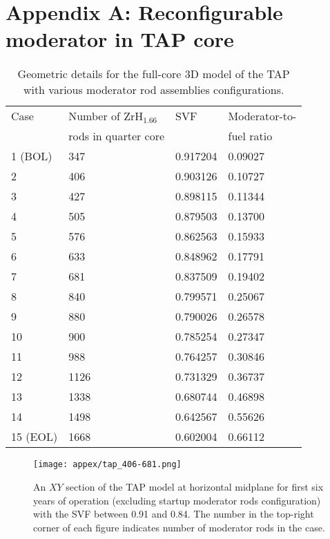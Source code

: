 \appendix
\chapter{Appendix A: Reconfigurable moderator in TAP core}
\label{appex:geometries}

\renewcommand{\thetable}{A.\arabic{table}}
\setcounter{table}{0}
\renewcommand{\thefigure}{A.\arabic{figure}}
\setcounter{figure}{0}
\begin{table}[h!]
	\caption{Geometric details for the full-core 3D model of the \gls{TAP} 
	with various moderator rod assemblies configurations. }
	\begin{tabularx}{\textwidth}{ X X X X}
		\hline
		Case & Number of ZrH$_{1.66}$ & \gls{SVF} & Moderator-to-\\ 
		     & rods in quarter core   &          & fuel ratio			\\ 
		     \hline
		1 (\gls{BOL}) &  347          & 0.917204 & 0.09027              \\
		2    &        406             & 0.903126 & 0.10727              \\
		3    &        427             & 0.898115 & 0.11344              \\
		4    &        505             & 0.879503 & 0.13700              \\
		5    &        576             & 0.862563 & 0.15933 		        \\
		6    &        633             & 0.848962 & 0.17791      	    \\
		7    &		  681			  & 0.837509 & 0.19402	            \\
		8    &        840             & 0.799571 & 0.25067              \\
		9    &        880             & 0.790026 & 0.26578              \\
		10   &        900             & 0.785254 & 0.27347              \\
		11   &        988             & 0.764257 & 0.30846 		        \\
		12   &        1126	          & 0.731329 & 0.36737      	    \\
		13   &		  1338	    	  & 0.680744 & 0.46898	            \\
		14   &		  1498			  & 0.642567 & 0.55626	            \\
		15 (\gls{EOL})& 1668          & 0.602004 & 0.66112              \\
		\hline
	\end{tabularx}
	\label{tab:tap_adjustable_core}
\end{table}
\newpage
\begin{figure}[htp!] %
	\centering
	\texttt{[image: appex/tap\_406-681.png]}
	\caption{An $XY$ section of the \gls{TAP} model at horizontal midplane for 
	first six years of operation (excluding startup moderator rods 
	configuration) with the \gls{SVF} between 0.91 and 0.84. The number in the 
	top-right corner of each figure indicates number of moderator rods in 
	the case.}
	\label{fig:tap-406-681}
\end{figure}

